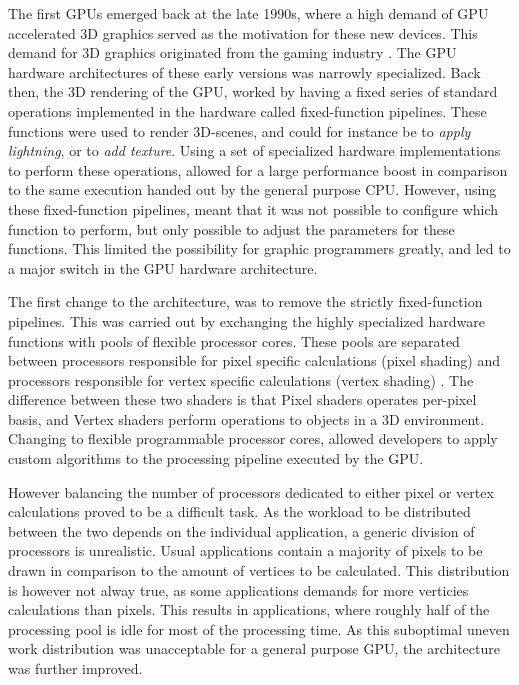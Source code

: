 The first GPUs  emerged back at the late 1990s, where a high demand of GPU accelerated 3D graphics served as the motivation for these new devices.
This demand for 3D graphics originated from the gaming industry \cite{Johansson2010}.
The GPU hardware architectures of these early versions was narrowly specialized.
Back then, the 3D rendering of the GPU, worked by having a fixed series of standard operations implemented in the hardware called fixed-function pipelines.
These functions were used to render 3D-scenes, and could for instance be to \textit{apply lightning}, or to \textit{add texture}.
Using a set of specialized hardware implementations to perform these operations, allowed for a large performance boost in comparison to the same execution handed out by the general purpose CPU.
However, using these fixed-function pipelines, meant that it was not possible to configure which function to perform, but only possible to adjust the parameters for these functions.
This limited the possibility for graphic programmers greatly, and led to a major switch in the GPU hardware architecture.

The first change to the architecture, was to remove the strictly fixed-function pipelines.
This was carried out by exchanging the highly specialized hardware functions with pools of flexible processor cores.
These pools are separated between processors responsible for pixel specific calculations (pixel shading) and processors responsible for vertex specific calculations (vertex shading) \cite{Johansson2010}.
The difference between these two shaders is that Pixel shaders operates per-pixel basis, and Vertex shaders perform operations to objects in a 3D environment.
Changing to flexible programmable processor cores, allowed developers to apply custom algorithms to the processing pipeline executed by the GPU.

However balancing the number of processors dedicated to either pixel or vertex calculations proved to be a difficult task.
As the workload to be distributed between the two depends on the individual application, a generic division of processors is unrealistic.
Usual applications contain a majority of pixels to be drawn in comparison to the amount of vertices to be calculated.
This distribution is however not alway true, as some applications demands for more verticies calculations than pixels.
This results in applications, where roughly half of the processing pool is idle for most of the processing time.
As this suboptimal uneven work distribution was unacceptable for a general purpose GPU, the architecture was further improved.

